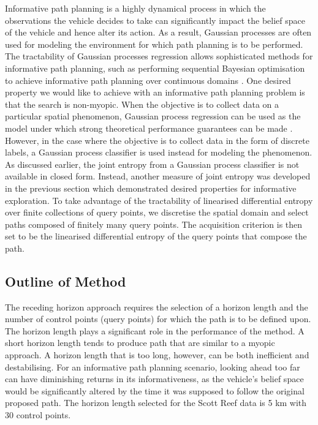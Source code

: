\documentclass{article}
\begin{document}
		Informative path planning is a highly dynamical process in which the observations the vehicle decides to take can significantly impact the belief space of the vehicle and hence alter its action. As a result, Gaussian processes are often used for modeling the environment for which path planning is to be performed. The tractability of Gaussian processes regression allows sophisticated methods for informative path planning, such as  performing sequential Bayesian optimisation to achieve informative path planning over continuous domains \cite{Roman:SequentialBayesianOptimisation}. One desired property we would like to achieve with an informative path planning problem is that the search is non-myopic. When the objective is to collect data on a particular spatial phenomenon, Gaussian process regression can be used as the model under which strong theoretical performance guarantees can be made \cite{Meliou:2007:NIP:1619645.1619742}. However, in the case where the objective is to collect data in the form of discrete labels, a Gaussian process classifier is used instead for modeling the phenomenon. As discussed earlier, the joint entropy from a Gaussian process classifier is not available in closed form. Instead, another measure of joint entropy was developed in the previous section which demonstrated desired properties for informative exploration. To take advantage of the tractability of linearised differential entropy over finite collections of query points, we discretise the spatial domain and select paths composed of finitely many query points. The acquisition criterion is then set to be the linearised differential entropy of the query points that compose the path.

		
	\subsection{Outline of Method}

		The receding horizon approach requires the selection of a horizon length and the number of control points (query points) for which the path is to be defined upon. The horizon length plays a significant role in the performance of the method. A short horizon length tends to produce path that are similar to a myopic approach. A horizon length that is too long, however, can be both inefficient and destabilising. For an informative path planning scenario, looking ahead too far can have diminishing returns in its informativeness, as the vehicle's belief space would be significantly altered by the time it was supposed to follow the original proposed path. The horizon length selected for the Scott Reef data is 5 km with 30 control points.
		
\end{document}
